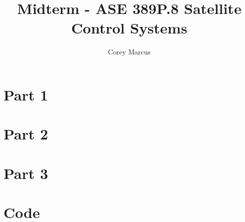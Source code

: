 \documentclass[]{article}
\title{Midterm - ASE 389P.8 Satellite Control Systems}
\author{Corey Marcus}
\begin{document}
\maketitle

\newcommand{\CrossProd}[1]{\left[ #1 \times \right]}

\section{Part 1}

\section{Part 2}

\section{Part 3}

\section{Code}
\end{document}
